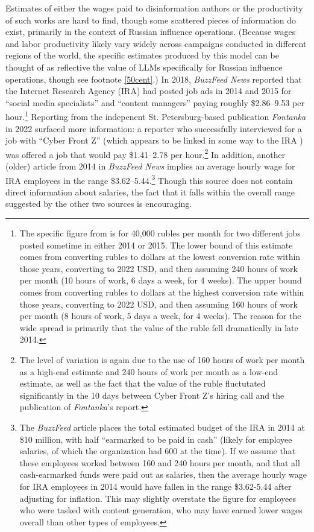 \documentclass{article}
\begin{document}
Estimates of either the wages paid to disinformation authors or the productivity of such works are hard to find, though some scattered pieces of information do exist, primarily in the context of Russian influence operations. (Because wages and labor productivity likely vary widely across campaigns conducted in different regions of the world, the specific estimates produced by this model can be thought of as reflective the value of LLMs specifically for Russian influence operations, though see footnote \ref{50cent}.) In 2018, \textit{BuzzFeed News} reported that the Internet Research Agency (IRA) had posted job ads in 2014 and 2015 for ``social media specialists'' and ``content managers'' paying roughly \$2.86–9.53 per hour.\footnote{The specific figure from \cite{buzzfeed} is for 40,000 rubles per month for two different jobs posted sometime in either 2014 or 2015. The lower bound of this estimate comes from converting rubles to dollars at the lowest conversion rate within those years, converting to 2022 USD, and then assuming 240 hours of work per month (10 hours of work, 6 days a week, for 4 weeks). The upper bound comes from converting rubles to dollars at the highest conversion rate within those years, converting to 2022 USD, and then assuming 160 hours of work per month (8 hours of work, 5 days a week, for 4 weeks). The reason for the wide spread is primarily that the value of the ruble fell dramatically in late 2014.} \cite{buzzfeed} Reporting from the indepenent St. Petersburg-based publication \textit{Fontanka} in 2022 surfaced more information: a reporter who successfully interviewed for a job with ``Cyber Front Z'' (which appears to be linked in some way to the IRA \cite{vice}) was offered a job that would pay \$1.41–2.78 per hour.\footnote{The level of variation is again due to the use of 160 hours of work per month as a high-end estimate and 240 hours of work per month as a low-end estimate, as well as the fact that the value of the ruble fluctutated significantly in the 10 days between Cyber Front Z's hiring call and the publication of \textit{Fontanka}'s report.} \cite{fontanka} In addition, another (older) article from 2014 in \textit{BuzzFeed News} implies an average hourly wage for IRA employees in the range \$3.62–5.44.\footnote{The \textit{BuzzFeed} article places the total estimated budget of the IRA in 2014 at \$10 million, with half ``earmarked to be paid in cash'' (likely for employee salaries, of which the organization had 600 at the time). If we assume that these employees worked between 160 and 240 hours per month, and that all cash-earmarked funds were paid out as salaries, then the average hourly wage for IRA employees in 2014 would have fallen in the range \$3.62-5.44 after adjusting for inflation. This may slightly overstate the figure for employees who were tasked with content generation, who may have earned lower wages overall than other types of employees.} \cite{seddon} Though this source does not contain direct information about salaries, the fact that it falls within the overall range suggested by the other two sources is encouraging. 
\end{document}
